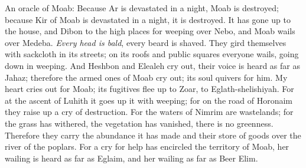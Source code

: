 \begin{biblechapter} %
 An oracle of Moab:
\verse Because Ar is devastated in a night, Moab is destroyed; 
because Kir of Moab is devastated in a night, it is destroyed.
\verse It has gone up to the house, 
and Dibon to the high places 
for weeping over Nebo, 
and Moab wails over Medeba. 
\textit{Every head is bald}, 
every beard is shaved.
\verse They gird themselves with sackcloth in its streets; 
on its roofs and public squares everyone wails, 
going down in weeping.
\verse And Heshbon and Elealeh cry out, 
their voice is heard as far as Jahaz; 
therefore the armed ones of Moab cry out; 
its soul quivers for him.
\verse My heart cries out for Moab; 
its fugitives flee up to Zoar, 
to Eglath-shelishiyah. 
For at the ascent of Luhith it goes up it with weeping; 
for on the road of Horonaim they raise up a cry of destruction.
\verse For the waters of Nimrim are wastelands; 
for the grass has withered, 
the vegetation has vanished, 
there is no greenness.
\verse Therefore they carry the abundance it has made 
and their store of goods over the river of the poplars.
\verse For a cry for help has encircled the territory of Moab, 
her wailing is heard as far as Eglaim, 
and her wailing as far as Beer Elim.
\end{biblechapter}

